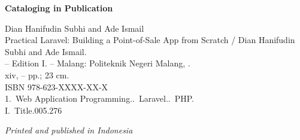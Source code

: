 \begin{titlepage}
\vspace{0.45cm}

\begin{tcolorbox}[
    enhanced,
    width=\linewidth,
    colback=white,
    colframe=black!45,
    boxrule=0.5pt,
    arc=1.5pt,
    left=8pt,
    right=8pt,
    top=8pt,
    bottom=8pt
]
{\bfseries\sffamily Cataloging in Publication}\par
\vspace{0.25cm}
\begingroup
\setlength{\parindent}{0pt}
Dian Hanifudin Subhi and Ade Ismail\\
\hspace*{1em}Practical Laravel: Building a Point-of-Sale App from Scratch /
Dian Hanifudin Subhi and Ade Ismail.\\
\hspace*{1em}-- Edition I. -- Malang: Politeknik Negeri Malang, \the\year.\\
\hspace*{1em}xiv, -- pp.; 23 cm.\\[0.2cm]
ISBN 978-623-XXXX-XX-X\\[0.2cm]
1.~Web Application Programming..~Laravel..~PHP.\\
I.~Title.\hfill 005.276
\endgroup
\end{tcolorbox}

\vfill

{\small\itshape Printed and published in Indonesia\par}

\end{titlepage}

\cleardoublepage
